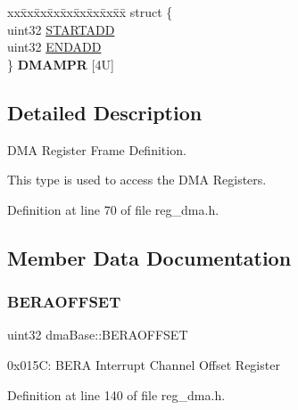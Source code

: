 \begin{DoxyCompactItemize}
\item 
\mbox{\label{structdmaBase_a002f2f21d39b3a30b354e55fb3c3108a}} 
\begin{tabbing}
xx\=xx\=xx\=xx\=xx\=xx\=xx\=xx\=xx\=\kill
struct \{\\
\>uint32 \mbox{\hyperlink{structdmaBase_ad04d7281f2cc05846088622762ed23bd}{STARTADD}}\\
\>uint32 \mbox{\hyperlink{structdmaBase_a64505f313f60d86380823659f296141b}{ENDADD}}\\
\} {\bfseries DMAMPR} \mbox{[}4U\mbox{]}\\

\end{tabbing}\end{DoxyCompactItemize}


\subsection{Detailed Description}
D\+MA Register Frame Definition. 

This type is used to access the D\+MA Registers. 

Definition at line 70 of file reg\+\_\+dma.\+h.



\subsection{Member Data Documentation}
\mbox{\label{structdmaBase_a2a032853abbbbda2d78869f4421d9b09}} 
\subsubsection{\texorpdfstring{B\+E\+R\+A\+O\+F\+F\+S\+ET}{BERAOFFSET}}
{\footnotesize\ttfamily uint32 dma\+Base\+::\+B\+E\+R\+A\+O\+F\+F\+S\+ET}

0x015C\+: B\+E\+RA Interrupt Channel Offset Register 

Definition at line 140 of file reg\+\_\+dma.\+h.

\mbox{\label{structdmaBase_aea82adef5d350fafa78d3f1dbe4be489}} 
